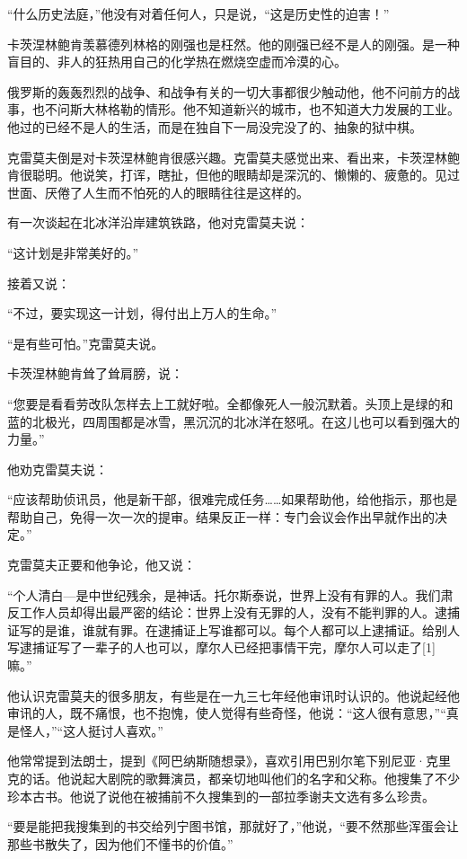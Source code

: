 “什么历史法庭，”他没有对着任何人，只是说，“这是历史性的迫害！”

卡茨涅林鲍肯羡慕德列林格的刚强也是枉然。他的刚强已经不是人的刚强。是一种盲目的、非人的狂热用自己的化学热在燃烧空虚而冷漠的心。

俄罗斯的轰轰烈烈的战争、和战争有关的一切大事都很少触动他，他不问前方的战事，也不问斯大林格勒的情形。他不知道新兴的城市，也不知道大力发展的工业。他过的已经不是人的生活，而是在独自下一局没完没了的、抽象的狱中棋。

克雷莫夫倒是对卡茨涅林鲍肯很感兴趣。克雷莫夫感觉出来、看出来，卡茨涅林鲍肯很聪明。他说笑，打诨，瞎扯，但他的眼睛却是深沉的、懒懒的、疲惫的。见过世面、厌倦了人生而不怕死的人的眼睛往往是这样的。

有一次谈起在北冰洋沿岸建筑铁路，他对克雷莫夫说：

“这计划是非常美好的。”

接着又说：

“不过，要实现这一计划，得付出上万人的生命。”

“是有些可怕。”克雷莫夫说。

卡茨涅林鲍肯耸了耸肩膀，说：

“您要是看看劳改队怎样去上工就好啦。全都像死人一般沉默着。头顶上是绿的和蓝的北极光，四周围都是冰雪，黑沉沉的北冰洋在怒吼。在这儿也可以看到强大的力量。”

他劝克雷莫夫说：

“应该帮助侦讯员，他是新干部，很难完成任务……如果帮助他，给他指示，那也是帮助自己，免得一次一次的提审。结果反正一样：专门会议会作出早就作出的决定。”

克雷莫夫正要和他争论，他又说：

“个人清白—是中世纪残余，是神话。托尔斯泰说，世界上没有有罪的人。我们肃反工作人员却得出最严密的结论：世界上没有无罪的人，没有不能判罪的人。逮捕证写的是谁，谁就有罪。在逮捕证上写谁都可以。每个人都可以上逮捕证。给别人写逮捕证写了一辈子的人也可以，摩尔人已经把事情干完，摩尔人可以走了[1]嘛。”

他认识克雷莫夫的很多朋友，有些是在一九三七年经他审讯时认识的。他说起经他审讯的人，既不痛恨，也不抱愧，使人觉得有些奇怪，他说：“这人很有意思，”“真是怪人，”“这人挺讨人喜欢。”

他常常提到法朗士，提到《阿巴纳斯随想录》，喜欢引用巴别尔笔下别尼亚·克里克的话。他说起大剧院的歌舞演员，都亲切地叫他们的名字和父称。他搜集了不少珍本古书。他说了说他在被捕前不久搜集到的一部拉季谢夫文选有多么珍贵。

“要是能把我搜集到的书交给列宁图书馆，那就好了，”他说，“要不然那些浑蛋会让那些书散失了，因为他们不懂书的价值。”

